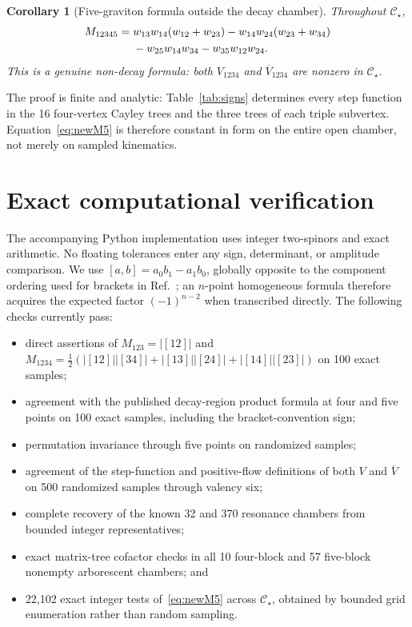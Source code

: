 \documentclass[11pt]{article}
\newtheorem{corollary}[theorem]{Corollary}
\theoremstyle{definition}
\theoremstyle{remark}
\newcommand{\abs}[1]{\lvert #1\rvert}
\newcommand{\Vbar}{\overline V}
\begin{document}
\begin{corollary}[Five-graviton formula outside the decay chamber]
Throughout $\mathcal C_\star$,
\begin{align}\label{eq:newM5}
  M_{12345}={}&
  w_{13}w_{14}(w_{12}+w_{23})
  -w_{14}w_{24}(w_{23}+w_{34})\notag\\
  &-w_{25}w_{14}w_{34}
  -w_{35}w_{12}w_{24}.
\end{align}
This is a genuine non-decay formula: both $V_{1234}$ and
$\Vbar_{1234}$ are nonzero in $\mathcal C_\star$.
\end{corollary}

The proof is finite and analytic: Table~\ref{tab:signs} determines every
step function in the 16 four-vertex Cayley trees and the three trees of each
triple subvertex.  Equation~\eqref{eq:newM5} is therefore constant in form on
the entire open chamber, not merely on sampled kinematics.

\section{Exact computational verification}

The accompanying Python implementation uses integer two-spinors and exact
arithmetic.  No floating tolerances enter any sign, determinant, or amplitude
comparison.  We use $[a,b]=a_0b_1-a_1b_0$, globally opposite to the component
ordering used for brackets in Ref.~\cite{GuevaraGraviton}; an $n$-point
homogeneous formula therefore acquires the expected factor $(-1)^{n-2}$ when
transcribed directly.  The following checks currently pass:

\begin{itemize}[leftmargin=2em]
  \item direct assertions of
        $M_{123}=\abs{[12]}$ and
        $M_{1234}=\tfrac12(\abs{[12]}\abs{[34]}+
        \abs{[13]}\abs{[24]}+\abs{[14]}\abs{[23]})$ on 100 exact samples;
  \item agreement with the published decay-region product formula at four and
        five points on 100 exact samples, including the bracket-convention sign;
  \item permutation invariance through five points on randomized samples;
  \item agreement of the step-function and positive-flow definitions of both
        $V$ and $\Vbar$ on 500 randomized samples through valency six;
  \item complete recovery of the known 32 and 370 resonance chambers from
        bounded integer representatives;
  \item exact matrix-tree cofactor checks in all 10 four-block and 57
        five-block nonempty arborescent chambers; and
  \item 22,102 exact integer tests of~\eqref{eq:newM5} across
        $\mathcal C_\star$, obtained by bounded grid enumeration rather than
        random sampling.
\end{itemize}
\end{document}

